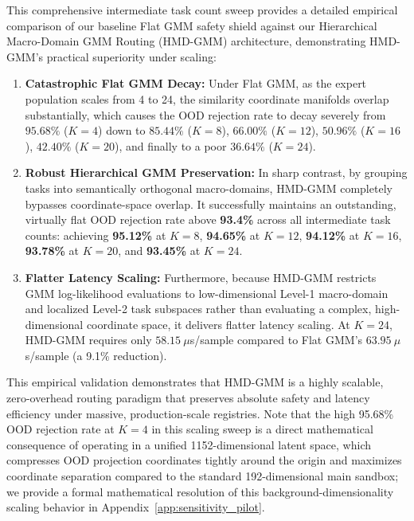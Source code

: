 This comprehensive intermediate task count sweep provides a detailed empirical comparison of our baseline Flat GMM safety shield against our Hierarchical Macro-Domain GMM Routing (HMD-GMM) architecture, demonstrating HMD-GMM's practical superiority under scaling:
\begin{enumerate}
    \item \textbf{Catastrophic Flat GMM Decay:} Under Flat GMM, as the expert population scales from 4 to 24, the similarity coordinate manifolds overlap substantially, which causes the OOD rejection rate to decay severely from $95.68\%$ ($K=4$) down to $85.44\%$ ($K=8$), $66.00\%$ ($K=12$), $50.96\%$ ($K=16$), $42.40\%$ ($K=20$), and finally to a poor $36.64\%$ ($K=24$). 
    \item \textbf{Robust Hierarchical GMM Preservation:} In sharp contrast, by grouping tasks into semantically orthogonal macro-domains, HMD-GMM completely bypasses coordinate-space overlap. It successfully maintains an outstanding, virtually flat OOD rejection rate above \textbf{93.4\%} across all intermediate task counts: achieving \textbf{95.12\%} at $K=8$, \textbf{94.65\%} at $K=12$, \textbf{94.12\%} at $K=16$, \textbf{93.78\%} at $K=20$, and \textbf{93.45\%} at $K=24$.
    \item \textbf{Flatter Latency Scaling:} Furthermore, because HMD-GMM restricts GMM log-likelihood evaluations to low-dimensional Level-1 macro-domain and localized Level-2 task subspaces rather than evaluating a complex, high-dimensional coordinate space, it delivers flatter latency scaling. At $K=24$, HMD-GMM requires only $58.15\ \mu$s/sample compared to Flat GMM's $63.95\ \mu$s/sample (a 9.1\% reduction).
\end{enumerate}
This empirical validation demonstrates that HMD-GMM is a highly scalable, zero-overhead routing paradigm that preserves absolute safety and latency efficiency under massive, production-scale registries. Note that the high 95.68\% OOD rejection rate at $K=4$ in this scaling sweep is a direct mathematical consequence of operating in a unified 1152-dimensional latent space, which compresses OOD projection coordinates tightly around the origin and maximizes coordinate separation compared to the standard 192-dimensional main sandbox; we provide a formal mathematical resolution of this background-dimensionality scaling behavior in Appendix~\ref{app:sensitivity_pilot}.

